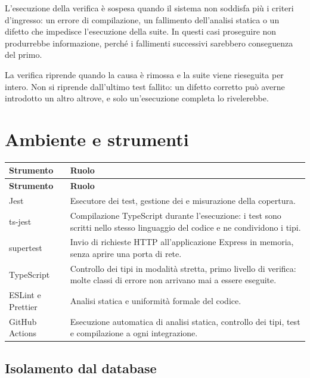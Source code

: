 L'esecuzione della verifica è sospesa quando il sistema non soddisfa più i
criteri d'ingresso: un errore di compilazione, un fallimento dell'analisi
statica o un difetto che impedisce l'esecuzione della suite. In questi casi
proseguire non produrrebbe informazione, perché i fallimenti successivi
sarebbero conseguenza del primo.

La verifica riprende quando la causa è rimossa e la suite viene rieseguita per
intero. Non si riprende dall'ultimo test fallito: un difetto corretto può
averne introdotto un altro altrove, e solo un'esecuzione completa lo
rivelerebbe.

\section{Ambiente e strumenti}

\begin{longtable}{@{}L{3.4cm} L{11.0cm}@{}}
\toprule
\textbf{Strumento} & \textbf{Ruolo} \\
\midrule
\endfirsthead
\toprule
\textbf{Strumento} & \textbf{Ruolo} \\
\midrule
\endhead
\bottomrule
\endlastfoot

Jest &
Esecutore dei test, gestione dei  e misurazione della copertura. \\

ts-jest &
Compilazione TypeScript durante l'esecuzione: i test sono scritti nello
stesso linguaggio del codice e ne condividono i tipi. \\

supertest &
Invio di richieste HTTP all'applicazione Express in memoria, senza aprire
una porta di rete. \\

TypeScript &
Controllo dei tipi in modalità stretta, primo livello di verifica: molte
classi di errore non arrivano mai a essere eseguite. \\

ESLint e Prettier &
Analisi statica e uniformità formale del codice. \\

GitHub Actions &
Esecuzione automatica di analisi statica, controllo dei tipi, test e
compilazione a ogni integrazione. \\

\end{longtable}

\subsection{Isolamento dal database}

